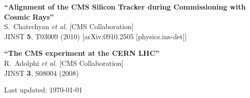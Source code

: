 \documentclass[10pt, a4paper]{article}
\begin{document}
\begin{thebibliography}{599}
{\bf ``Alignment of the CMS Silicon Tracker during Commissioning with Cosmic Rays''}
  \\{}S.~Chatrchyan {\it et al.}  [CMS Collaboration]
  \\{}JINST {\bf 5}, T03009 (2010)
  [arXiv:0910.2505 [physics.ins-det]]

{\bf ``The CMS experiment at the CERN LHC''}
  \\{}R.~Adolphi {\it et al.}  [CMS Collaboration]
  \\{}JINST {\bf 3}, S08004 (2008)

\end{thebibliography}

\vfill{}
\hrulefill

\begin{center}
{\footnotesize Last updated: \today}
\end{center}
\end{document}

